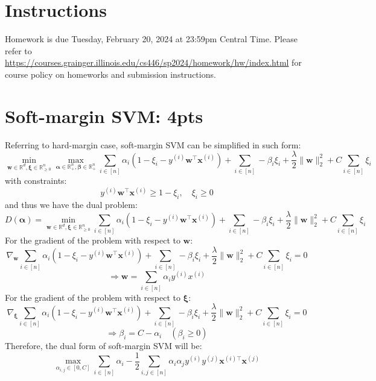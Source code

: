 \documentclass[12pt]{article}
\begin{document}
\singlespacing

\renewcommand{\familydefault}{\rmdefault}


\section{Instructions}

Homework is due Tuesday, February 20, 2024 at 23:59pm Central Time.
Please refer to \url{https://courses.grainger.illinois.edu/cs446/sp2024/homework/hw/index.html} for course policy on homeworks and submission instructions.

\section{Soft-margin SVM: 4pts}
Referring to hard-margin case, soft-margin SVM can be simplified in such form:
\[\min_{\boldsymbol{w} \in \mathbb{R}^d,\boldsymbol{\xi} \in \mathbb{R}^n_{\geq 0}} 
\max_{\boldsymbol{\alpha} \in \mathbb{R}^n_+, \boldsymbol{\beta} \in \mathbb{R}^n_+} 
\sum_{i \in [n]} \alpha_i (1 - \xi_i - y^{(i)} \boldsymbol{w}^{\top} \boldsymbol{x}^{(i)}) 
+ \sum_{i \in [n]} -\beta_i \xi_i
+ \frac{\lambda}{2}\|\boldsymbol{w}\|_2^2
+ C \sum_{i \in [n]}\xi_i\]
with constraints:
\[y^{(i)} \boldsymbol{w}^{\top} \boldsymbol{x}^{(i)} \geq 1 - \xi_i
,\quad
\xi_i \geq 0\]
and thus we have the dual problem:
\[D(\boldsymbol{\alpha}) = 
\min_{\boldsymbol{w} \in \mathbb{R}^d,\boldsymbol{\xi} \in \mathbb{R}^n_{\geq 0}} 
\sum_{i \in [n]} \alpha_i (1 - \xi_i - y^{(i)} \boldsymbol{w}^{\top} \boldsymbol{x}^{(i)})
+ \sum_{i \in [n]} -\beta_i \xi_i
+ \frac{\lambda}{2}\|\boldsymbol{w}\|_2^2
+ C \sum_{i \in [n]}\xi_i\]
For the gradient of the problem with respect to $\boldsymbol{w}$:
\[\nabla_{\boldsymbol{w}}
\sum_{i \in [n]} \alpha_i (1 - \xi_i - y^{(i)} \boldsymbol{w}^{\top} \boldsymbol{x}^{(i)})
+ \sum_{i \in [n]} -\beta_i \xi_i
+ \frac{\lambda}{2}\|\boldsymbol{w}\|_2^2
+ C \sum_{i \in [n]}\xi_i
= 0\]
\[\Rightarrow \boldsymbol{w} = \sum_{i \in [n]} \alpha_i y^{(i)} x^{(i)}\]
For the gradient of the problem with respect to $\boldsymbol{\xi}$:
\[\nabla_{\boldsymbol{\xi}}
\sum_{i \in [n]} \alpha_i (1 - \xi_i - y^{(i)} \boldsymbol{w}^{\top} \boldsymbol{x}^{(i)})
+ \sum_{i \in [n]} -\beta_i \xi_i
+ \frac{\lambda}{2}\|\boldsymbol{w}\|_2^2
+ C \sum_{i \in [n]}\xi_i
= 0\]
\[\Rightarrow \beta_i = C - \alpha_i\quad(\beta_i\geq0)\]
Therefore, the dual form of soft-margin SVM will be:
\[\max_{\alpha_{i,j} \in [0, C]}
\sum_{i \in [n]} \alpha_i - 
\frac{1}{2}\sum_{i,j \in [n]}\alpha_i\alpha_j y^{(i)} y^{(j)} 
\boldsymbol{x}^{(i)\top} \boldsymbol{x}^{(j)}\]
\newpage
\end{document}
